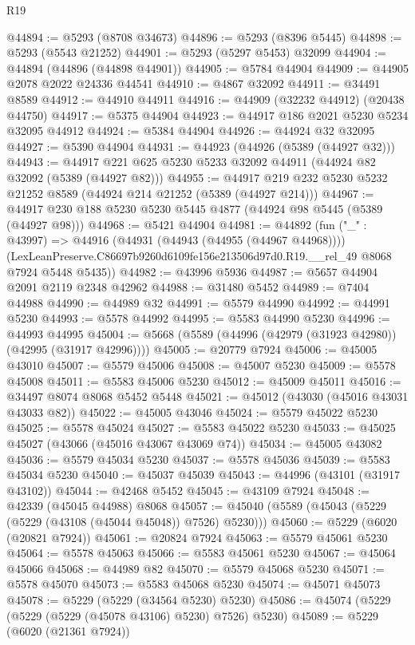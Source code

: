 \begin{lexlean}{R19}
\begin{coremodule}
@44894 := @5293 (@8708 @34673)
@44896 := @5293 (@8396 @5445)
@44898 := @5293 (@5543 @21252)
@44901 := @5293 (@5297 @5453) @32099
@44904 := @44894 (@44896 (@44898 @44901))
@44905 := @5784 @44904
@44909 := @44905 @2078 @2022 @24336 @44541
@44910 := @4867 @32092
@44911 := @34491 @8589
@44912 := @44910 @44911
@44916 := @44909 (@32232 @44912) (@20438 @44750)
@44917 := @5375 @44904
@44923 := @44917 @186 @2021 @5230 @5234 @32095 @44912
@44924 := @5384 @44904
@44926 := @44924 @32 @32095
@44927 := @5390 @44904
@44931 := @44923 (@44926 (@5389 (@44927 @32)))
@44943 := @44917 @221 @625 @5230 @5233 @32092 @44911 (@44924 @82 @32092 (@5389 (@44927 @82)))
@44955 := @44917 @219 @232 @5230 @5232 @21252 @8589 (@44924 @214 @21252 (@5389 (@44927 @214)))
@44967 := @44917 @230 @188 @5230 @5230 @5445 @4877 (@44924 @98 @5445 (@5389 (@44927 @98)))
@44968 := @5421 @44904
@44981 := @44892
    (fun ("_" : @43997) =>
    @44916
      (@44931 (@44943 (@44955 (@44967 @44968))))
      (LexLeanPreserve.C86697b9260d6109fe156e213506d97d0.R19.__rel_49 @8068 @7924 @5448 @5435))
@44982 := @43996 @5936
@44987 := @5657 @44904 @2091 @2119 @2348 @42962
@44988 := @31480 @5452
@44989 := @7404 @44988
@44990 := @44989 @32
@44991 := @5579 @44990
@44992 := @44991 @5230
@44993 := @5578 @44992
@44995 := @5583 @44990 @5230
@44996 := @44993 @44995
@45004 := @5668 (@5589 (@44996 (@42979 (@31923 @42980)) (@42995 (@31917 @42996))))
@45005 := @20779 @7924
@45006 := @45005 @43010
@45007 := @5579 @45006
@45008 := @45007 @5230
@45009 := @5578 @45008
@45011 := @5583 @45006 @5230
@45012 := @45009 @45011
@45016 := @34497 @8074 @8068 @5452 @5448
@45021 := @45012 (@43030 (@45016 @43031 @43033 @82))
@45022 := @45005 @43046
@45024 := @5579 @45022 @5230
@45025 := @5578 @45024
@45027 := @5583 @45022 @5230
@45033 := @45025 @45027 (@43066 (@45016 @43067 @43069 @74))
@45034 := @45005 @43082
@45036 := @5579 @45034 @5230
@45037 := @5578 @45036
@45039 := @5583 @45034 @5230
@45040 := @45037 @45039
@45043 := @44996 (@43101 (@31917 @43102))
@45044 := @42468 @5452
@45045 := @43109 @7924
@45048 := @42339 (@45045 @44988) @8068
@45057 := @45040 (@5589 (@45043 (@5229 (@5229 (@43108 (@45044 @45048)) @7526) @5230)))
@45060 := @5229 (@6020 (@20821 @7924))
@45061 := @20824 @7924
@45063 := @5579 @45061 @5230
@45064 := @5578 @45063
@45066 := @5583 @45061 @5230
@45067 := @45064 @45066
@45068 := @44989 @82
@45070 := @5579 @45068 @5230
@45071 := @5578 @45070
@45073 := @5583 @45068 @5230
@45074 := @45071 @45073
@45078 := @5229 (@5229 (@34564 @5230) @5230)
@45086 := @45074 (@5229 (@5229 (@5229 (@45078 @43106) @5230) @7526) @5230)
@45089 := @5229 (@6020 (@21361 @7924))

\end{coremodule}
\end{lexlean}
